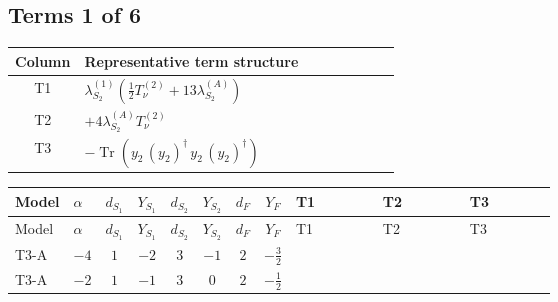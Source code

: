 \documentclass[8pt]{article}
\begin{document}
\begin{landscape}
\subsection*{Terms 1 of 6}
\begin{center}
\begin{tabular}{@{}c >{\raggedright\arraybackslash}p{0.82\linewidth}@{}}
\toprule
Column & Representative term structure \\
\midrule
T1 & \(\displaystyle {\lambda_{S_2}^{(1)}} \left(\frac{1}{2} T_{\nu}^{(2)}+13 {\lambda_{S_2}^{(A)}}\right)\) \\
\midrule
T2 & \(\displaystyle +4 {\lambda_{S_2}^{(A)}} T_{\nu}^{(2)}\) \\
\midrule
T3 & \(\displaystyle -\operatorname{Tr}\!\left({y_2}\,\left({y_2}\right)^{\dagger}\,{y_2}\,\left({y_2}\right)^{\dagger}\right)\) \\
\midrule
\bottomrule
\end{tabular}
\end{center}
\smallskip
\tiny
\begin{longtable}{@{}llcccccc >{\raggedright\arraybackslash}p{0.21\linewidth} >{\raggedright\arraybackslash}p{0.21\linewidth} >{\raggedright\arraybackslash}p{0.21\linewidth}@{}}
\toprule
Model & $\alpha$ & $d_{S_1}$ & $Y_{S_1}$ & $d_{S_2}$ & $Y_{S_2}$ & $d_F$ & $Y_F$ & T1 & T2 & T3 \\
\midrule
\endfirsthead
\toprule
Model & $\alpha$ & $d_{S_1}$ & $Y_{S_1}$ & $d_{S_2}$ & $Y_{S_2}$ & $d_F$ & $Y_F$ & T1 & T2 & T3 \\
\midrule
\endhead
T3-A & $-4$ & $1$ & $-2$ & $3$ & $-1$ & $2$ & $-\frac{3}{2}$ & \scriptsize\adjustbox{max width=\linewidth}{$\begin{gathered} {\lambda_{S_2}^{(1)}} \left(\frac{1}{2} T_{\nu}^{(2)}+13 {\lambda_{S_2}^{(A)}}\right)\end{gathered}$} & \scriptsize\adjustbox{max width=\linewidth}{$\begin{gathered} +4 {\lambda_{S_2}^{(A)}} T_{\nu}^{(2)}\end{gathered}$} & \scriptsize\adjustbox{max width=\linewidth}{$\begin{gathered} -\operatorname{Tr}\!\left({y_2}\,\left({y_2}\right)^{\dagger}\,{y_2}\,\left({y_2}\right)^{\dagger}\right)\end{gathered}$} \\
\midrule
T3-A & $-2$ & $1$ & $-1$ & $3$ & $0$ & $2$ & $-\frac{1}{2}$ & \scriptsize\adjustbox{max width=\linewidth}{$\begin{gathered} {\lambda_{S_2}^{(1)}} \left(\frac{1}{2} T_{\nu}^{(2)}+13 {\lambda_{S_2}^{(A)}}\right)\end{gathered}$} & \scriptsize\adjustbox{max width=\linewidth}{$\begin{gathered} +4 {\lambda_{S_2}^{(A)}} T_{\nu}^{(2)}\end{gathered}$} & \scriptsize\adjustbox{max width=\linewidth}{$\begin{gathered} -\operatorname{Tr}\!\left({y_2}\,\left({y_2}\right)^{\dagger}\,{y_2}\,\left({y_2}\right)^{\dagger}\right)\end{gathered}$} \\

\end{longtable}
\end{landscape}
\end{document}
